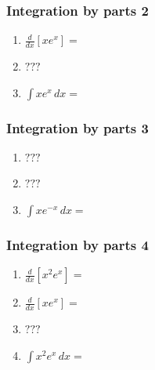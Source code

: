 \documentclass[14pt]{beamer}
\begin{document}
	\begin{frame}[t]
		\frametitle{Integration by parts 2}

		\begin{enumerate}
			\item $\displaystyle \frac{d}{dx}\left[ x e^{x}\right] =$
				\vspace{.5cm}

			\item $\displaystyle ???$
				\vspace{.5cm}

			\item $\displaystyle \int x e^{x}\, dx =$
		\end{enumerate}
	\end{frame}

	\begin{frame}[t]
		\frametitle{Integration by parts 3}

		\begin{enumerate}
			\item $\displaystyle ???$
				\vspace{.3cm}

			\item $\displaystyle ???$
				\vspace{.3cm}

			\item $\displaystyle \int x e^{-x}\, dx =$
		\end{enumerate}
	\end{frame}

	\begin{frame}[t]
		\frametitle{Integration by parts 4}

		\begin{enumerate}
			\item $\displaystyle \frac{d}{dx}\left[ x^{2}e^{x}\right] =$
				\vspace{.1cm}
				\vspace{.1cm}

			\item $\displaystyle \frac{d}{dx}\left[ x e^{x}\right] =$
				\vspace{.5cm}

			\item $\displaystyle ???$
				\vspace{.5cm}

			\item $\displaystyle \int x^{2}e^{x}\, dx =$
		\end{enumerate}
	\end{frame}
\end{document}
